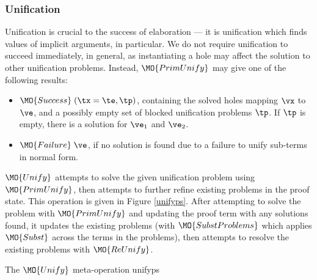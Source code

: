 \subsubsection{Unification}

Unification is crucial to the success of elaboration --- it is unification
which finds values of implicit arguments, in particular. We do not require
unification to succeed immediately, in general, as instantiating a hole may 
affect the solution to other unification problems. Instead, 
$\MO{PrimUnify}$ may give one of the following results:

\begin{itemize}
\item $\MO{Success}\;(\tx=\te, \tp)$, containing the solved holes mapping
$\vx$ to $\ve$, and a possibly empty set of blocked unification problems $\tp$.
If $\tp$ is empty, there is a solution for $\ve_1$ and $\ve_2$. 
\item $\MO{Failure}\;\ve$, if no solution is found due to a failure to unify
sub-terms in normal form.
\end{itemize}

$\MO{Unify}$ attempts to solve the given unification problem using
$\MO{PrimUnify}$,
then attempts to further refine existing problems in the proof
state. This operation is given in Figure \ref{unifyps}. After attempting to
solve the problem with $\MO{PrimUnify}$ and updating the proof term with
any solutions found, it updates the existing problems (with $\MO{SubstProblems}$
which applies $\MO{Subst}$ across the terms in the problems), then attempts to
resolve the existing problems with $\MO{ReUnify}$.

{The $\MO{Unify}$ meta-operation}
{unifyps}



